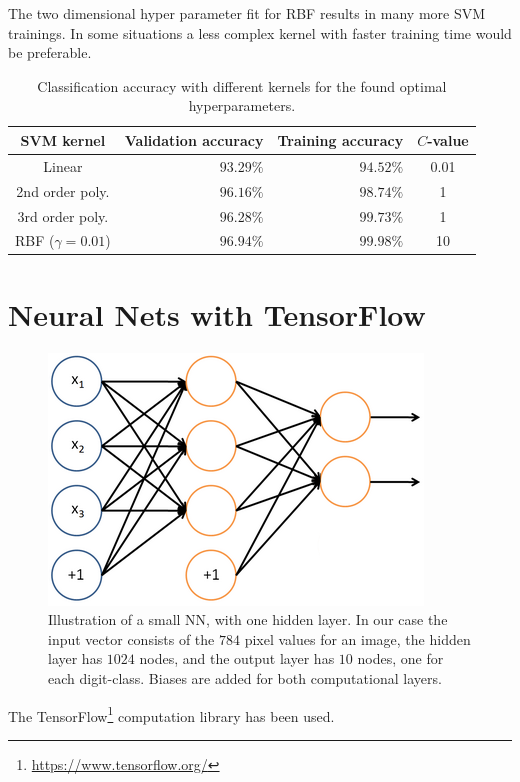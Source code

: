 \documentclass[a4paper,10pt,article,oneside,english]{memoir}
\begin{document}
The two dimensional hyper parameter fit for RBF results in many more SVM trainings. In some situations a less complex kernel with faster training time would be preferable.

\begin{table}[h!]
	\centering
	\caption{Classification accuracy with different kernels for the found optimal hyperparameters. }
	\label{tab:svm_accuracy}
	\begin{tabular}{crr S[table-format=2.4]}
		SVM kernel & Validation accuracy & Training accuracy & {$C$-value} \\ 
		\hline 
		Linear & $93.29\%$ & $94.52\%$ & 0.01 \\ 
		2nd order poly. & $96.16\%$ & $98.74\%$ & 1 \\ 
		3rd order poly. & $96.28\%$ & $99.73\%$ & 1 \\ 
		RBF ($\gamma=0.01$) & $96.94\%$ & $99.98\%$ & 10 \\ 
	\end{tabular} 
\end{table}










\chapter{Neural Nets with TensorFlow}

\begin{figure}[h!]
	\centering
	\includegraphics[width=0.4\linewidth]{nn_layout.png}
	\caption{Illustration of a small NN, with one hidden layer. In our case the input vector consists of the $784$ pixel values for an image, the hidden layer has $1024$ nodes, and the output layer has $10$ nodes, one for each digit-class. Biases are added for both computational layers.}
	\label{fig:nn_layout}
\end{figure}
The TensorFlow\footnote{\url{https://www.tensorflow.org/}} computation library has been used.
\end{document}
